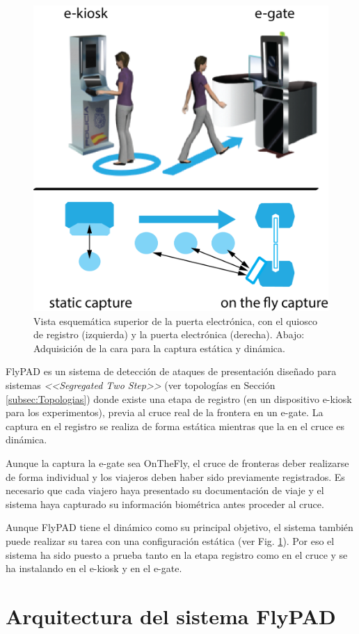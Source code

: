 \begin{figure}[t!]
    \centering
    \includegraphics[width=.5\textwidth]{ch-sistemasABC/images/ch-onthefly/GraficaKioskGate.png}
    \caption{Vista esquemática superior de la puerta electrónica, con el quiosco de registro (izquierda) y la puerta electrónica (derecha). Abajo: Adquisición de la cara para la captura estática y dinámica.}
    \label{fig:staticvsdynamic}
\end{figure}

\gls{FlyPAD} es un sistema de detección de ataques de presentación diseñado para sistemas \textit{<<Segregated Two Step>>}  (ver topologías  en Sección \ref{subsec:Topologias}) donde existe una etapa de registro (en un dispositivo \gls{e-kiosk} para los experimentos), previa al cruce real de la frontera en un \gls{e-gate}. La captura en el registro se realiza de forma estática mientras que la en el cruce es dinámica.

Aunque la captura la \gls{e-gate} sea \gls{OnTheFly}, el cruce de fronteras deber realizarse de forma individual y los viajeros deben haber sido previamente registrados. Es necesario que cada viajero haya presentado su documentación de viaje y el sistema haya capturado su información biométrica antes proceder al cruce.

Aunque \gls{FlyPAD} tiene el  dinámico como su principal objetivo, el sistema también puede realizar su tarea con una configuración estática (ver Fig. \ref{fig:staticvsdynamic}). Por eso el sistema ha sido puesto a prueba tanto en la etapa registro como en el cruce y se ha instalando en el \gls{e-kiosk} y en el \gls{e-gate}.


\section{Arquitectura del sistema FlyPAD}\label{sec:ArquitecturaFlayPAD}

